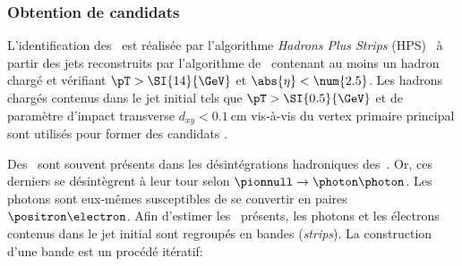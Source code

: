 \subsubsection{Obtention de candidats}
L'identification des \tauh\ est réalisée par l'algorithme \emph{Hadrons Plus Strips} (HPS)~\cite{Khachatryan:2015dfa,Sirunyan:2018pgf} à partir des jets reconstruits par l'algorithme de \PF\ contenant au moins un hadron chargé et vérifiant $\pT>\SI{14}{\GeV}$ et $\abs{\eta}<\num{2.5}$.
Les hadrons chargés contenus dans le jet initial tels que $\pT>\SI{0.5}{\GeV}$ et de paramètre d'impact transverse $d_{xy}<\SI{0.1}{\centi\meter}$ vis-à-vis du vertex primaire principal sont utilisés pour former des candidats \tauh.
\par
Des \pionnull\ sont souvent présents dans les désintégrations hadroniques des~\tau.
Or, ces derniers se désintègrent à leur tour selon $\pionnull\to\photon\photon$.
Les photons sont eux-mêmes susceptibles de se convertir en paires $\positron\electron$.
Afin d'estimer les \pionnull\ présents,
les photons et les électrons contenus dans le jet initial sont regroupés en bandes (\emph{strips}).
La construction d'une bande est un procédé itératif:
